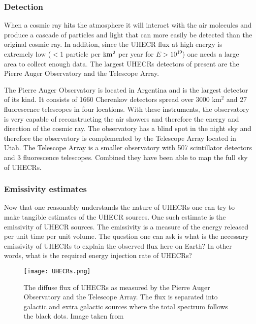 




\subsubsection{Detection}
When a cosmic ray hits the atmosphere it will interact with the air molecules and produce a cascade of particles and light that can more easily be detected than 
the original cosmic ray. In addition, since the UHECR flux at high energy is extremely low ($<$1 particle per $\rm km^2$ per year for $E > 10^{19}$) one needs a large area to collect enough data. 
The largest UHECRs detectors of present are the Pierre Auger Observatory and the Telescope Array. 

The Pierre Auger Observatory is located in Argentina and is the largest detector of its kind. It consists of 1660  Cherenkov detectors spread over 3000 km$^2$ and 27 fluorescence telescopes in four locations. With 
these instruments, the observatory is very capable of reconstructing the air showers and therefore the energy and direction of the cosmic ray. The observatory has a blind spot in the night sky 
and therefore the observatory is complemented by the Telescope Array located in Utah. The Telescope Array is a smaller observatory with 507 scintillator detectors and 3 fluorescence telescopes. Combined they have been able to map the full sky of UHECRs.  

\subsubsection{Emissivity estimates}
\label{sec:emmisivity}

Now that one reasonably understands the nature of UHECRs one can try to make tangible estimates of the UHECR sources. One such
estimate is the emissivity of UHECR sources. The emissivity is a measure of the energy released per unit time per unit volume. The question 
one can ask is what is the necessary emissivity of UHECRs to explain the observed flux here on Earth? In other words, what is the required energy injection rate of UHECRs?


\begin{figure}
    \centering
    \texttt{[image: UHECRs.png]}
    \caption{The diffuse flux of UHECRs as measured by the Pierre Auger Observatory and the Telescope Array. The flux is separated into galactic and extra galactic sources where the total spectrum follows the black dots. Image taken from \cite{Abdul_Halim_2023}}
    \label{fig:flux_UHECRs}
\end{figure}

